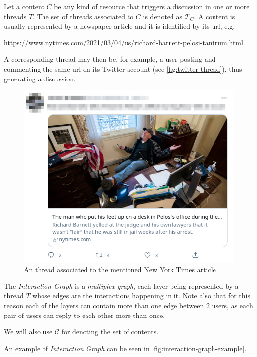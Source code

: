 Let a content $C$ be any kind of resource that triggers a discussion in one or
more threads $T$. The set of threads associated to $C$ is denoted as
$\mathcal{T}_{C} $. A content is usually represented by a newspaper article and
it is identified by its url, e.g.

	{\footnotesize
		\begin{center}
			\url{https://www.nytimes.com/2021/03/04/us/richard-barnett-pelosi-tantrum.html}
		\end{center}
	}

A corresponding thread may then be, for example, a user posting and commenting
the same url on its Twitter account (see \autoref{fig:twitter-thread}), thus
generating a discussion.

\begin{figure}
	\centering
	\includegraphics[width=0.6\linewidth]{tex/img/twitter_thread.png}
	\caption[Thread-content distinction example from Twitter]{An thread associated to the mentioned New York Times article}%
	\label{fig:twitter-thread}
\end{figure}

The \emph{Interaction Graph} is a \emph{multiplex graph}, each layer being
represented by a thread $T$ whose edges are the interactions happening in it.
Note also that for this reason each of the layers can contain more than one
edge between $2$ users, as each pair of users can reply to each other more than
once.

We will also use $\mathcal{C} $ for denoting the set of contents.

An example of \emph{Interaction Graph} can be seen in
\autoref{fig:interaction-graph-example}.

